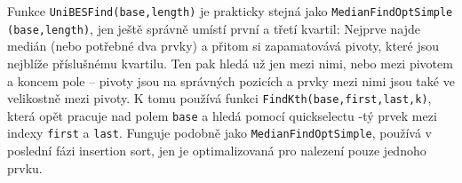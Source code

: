         Funkce {\tt UniBESFind(base,length)} je prakticky stejná jako {\tt MedianFindOptSimple} {\tt (base,length)}, jen ještě správně umístí první a třetí kvartil: Nejprve najde medián (nebo potřebné dva prvky) a přitom si zapamatovává pivoty, které jsou nejblíže příslušnému kvartilu. Ten pak hledá už jen mezi nimi, nebo mezi pivotem a koncem pole -- pivoty jsou na správných pozicích a prvky mezi nimi jsou také ve velikostně mezi pivoty. K tomu používá funkci {\tt FindKth(base,first,last,k)}, která opět pracuje nad polem {\tt base} a hledá pomocí quickselectu \kk-tý prvek mezi indexy {\tt first} a {\tt last}. Funguje podobně jako {\tt MedianFindOptSimple}, používá v poslední fázi insertion sort, jen je optimalizovaná pro nalezení pouze jednoho prvku.
























